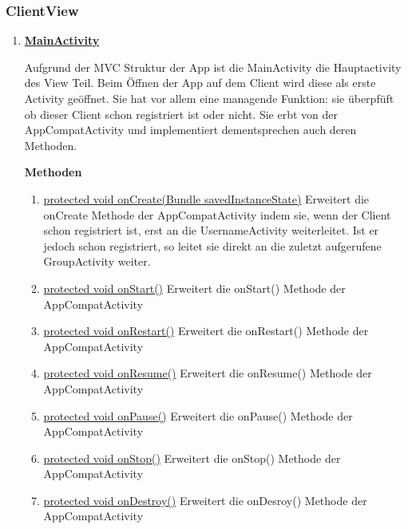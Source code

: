 \subsubsection{ClientView}
\begin{enumerate}
	\item \textbf{\underline{MainActivity}}
	
	Aufgrund der MVC Struktur der App ist die MainActivity die Hauptactivity des View Teil. Beim Öffnen der App auf dem Client wird diese als erste Activity geöffnet. Sie hat vor allem eine managende Funktion: sie überpfüft ob dieser Client schon registriert ist oder nicht. Sie erbt von der AppCompatActivity und implementiert dementsprechen auch deren Methoden.
	
	\textbf{Methoden}
	\begin{enumerate}
		\item \underline{protected void onCreate(Bundle savedInstanceState)} 
		Erweitert die onCreate Methode der AppCompatActivity indem sie, wenn der Client schon registriert ist, erst an die UsernameActivity weiterleitet. Ist er jedoch schon registriert, so leitet sie direkt an die zuletzt aufgerufene GroupActivity weiter.
		\item \underline{protected void onStart()}
		Erweitert die onStart() Methode der AppCompatActivity %
		\item \underline{protected void onRestart()}
		Erweitert die onRestart() Methode der AppCompatActivity %
		\item \underline{protected void onResume()}
		Erweitert die onResume() Methode der AppCompatActivity %
		\item \underline{protected void onPause()}
		Erweitert die onPause() Methode der AppCompatActivity %
		\item \underline{protected void onStop()}
		Erweitert die onStop() Methode der AppCompatActivity %
		\item \underline{protected void onDestroy()}
		Erweitert die onDesroy() Methode der AppCompatActivity %
	\end{enumerate}
	

\end{enumerate}
